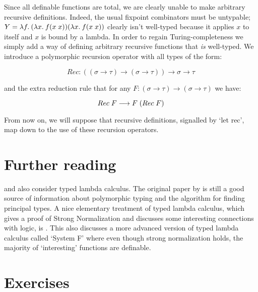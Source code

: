 Since all definable functions are total, we are clearly unable to make
arbitrary recursive definitions. Indeed, the usual fixpoint combinators must be
untypable; $Y = \lambda f.\: (\lambda x.\: f(x\; x)) (\lambda x.\: f(x\; x))$ clearly isn't
well-typed because it applies $x$ to itself and $x$ is bound by a lambda. In
order to regain Turing-completeness we simply add a way of defining arbitrary
recursive functions that {\em is} well-typed. We introduce a polymorphic
recursion operator with all types of the form:

$$ Rec : ((\sigma \to \tau) \to (\sigma \to \tau)) \to \sigma \to \tau $$

\noindent and the extra reduction rule that for any $F:(\sigma \to \tau) \to
(\sigma \to \tau)$ we have:

$$ Rec\; F \longrightarrow F\; (Rec\;  F) $$

From now on, we will suppose that recursive definitions, signalled by `let
rec', map down to the use of these recursion operators.

\section*{Further reading}

 and  also consider typed lambda
calculus. The original paper by  is still a good source of
information about polymorphic typing and the algorithm for finding principal
types. A nice elementary treatment of typed lambda calculus, which gives a
proof of Strong Normalization and discusses some interesting connections with
logic, is . This also discusses a more advanced version of
typed lambda calculus called `System F' where even though strong normalization
holds, the majority of `interesting' functions are definable.

%

\section*{Exercises}

